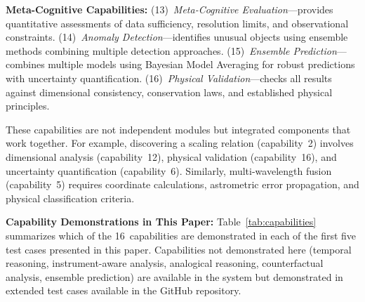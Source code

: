 \documentclass[fleqn,usenatbib]{mnras}
\begin{document}
\textbf{Meta-Cognitive Capabilities:}
(13)~\emph{Meta-Cognitive Evaluation}---provides quantitative assessments of data sufficiency, resolution limits, and observational constraints.
(14)~\emph{Anomaly Detection}---identifies unusual objects using ensemble methods combining multiple detection approaches.
(15)~\emph{Ensemble Prediction}---combines multiple models using Bayesian Model Averaging for robust predictions with uncertainty quantification.
(16)~\emph{Physical Validation}---checks all results against dimensional consistency, conservation laws, and established physical principles.

These capabilities are not independent modules but integrated components that work together.
For example, discovering a scaling relation (capability~2) involves dimensional analysis (capability~12), physical validation (capability~16), and uncertainty quantification (capability~6).
Similarly, multi-wavelength fusion (capability~5) requires coordinate calculations, astrometric error propagation, and physical classification criteria.

\textbf{Capability Demonstrations in This Paper:}
Table~\ref{tab:capabilities} summarizes which of the 16~capabilities are demonstrated in each of the first five test cases presented in this paper.
Capabilities not demonstrated here (temporal reasoning, instrument-aware analysis, analogical reasoning, counterfactual analysis, ensemble prediction) are available in the system but demonstrated in extended test cases available in the GitHub repository.
\end{document}
